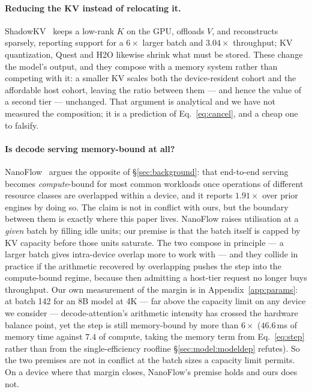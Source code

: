 \paragraph{Reducing the KV instead of relocating it.} ShadowKV~\cite{shadowkv}
keeps a low-rank $K$ on the GPU, offloads $V$, and reconstructs sparsely,
reporting support for a $6\times$ larger batch and $3.04\times$ throughput; KV
quantization, Quest and H2O likewise shrink what must be stored. These change
the model's output, and they compose with a memory system rather than competing
with it: a smaller KV scales both the device-resident cohort and the affordable
host cohort, leaving the ratio between them --- and hence the value of a second
tier --- unchanged. That argument is analytical and we have not measured the
composition; it is a prediction of Eq.~\ref{eq:cancel}, and a cheap one to
falsify.


\paragraph{Is decode serving memory-bound at all?} NanoFlow~\cite{nanoflow}
argues the opposite of \S\ref{sec:background}: that end-to-end serving becomes
\emph{compute}-bound for most common workloads once operations of different
resource classes are overlapped within a device, and it reports $1.91\times$ over
prior engines by doing so. The claim is not in conflict with ours, but the boundary
between them is exactly where this paper lives. NanoFlow raises utilisation at a
\emph{given} batch by filling idle units; our premise is that the batch itself is
capped by KV capacity before those units saturate. The two compose in principle ---
a larger batch gives intra-device overlap more to work with --- and they collide in
practice if the arithmetic recovered by overlapping pushes the step into the
compute-bound regime, because then admitting a host-tier request no longer buys
throughput. Our own measurement of the margin is in
Appendix~\ref{app:params}: at batch 142 for an 8B model at 4K --- far above the
capacity limit on any device we consider --- decode-attention's arithmetic
intensity has crossed the hardware balance point, yet the step is still
memory-bound by more than $6\times$ ($46.6$\,ms of memory time against $7.4$ of
compute, taking the memory term from Eq.~\ref{eq:step} rather than from the
single-efficiency roofline \S\ref{sec:model:modeldep} refutes). So the two premises
are not in conflict at the batch sizes a capacity limit permits. On a device where
that margin closes, NanoFlow's premise holds and ours does not.

